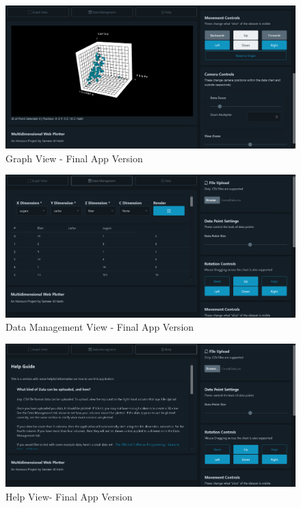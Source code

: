 \begin{figure}[h]
    \centering
    \includegraphics[width=1\textwidth]{author-files/figures/Graph-Fin.PNG}
    \caption{Graph View - Final App Version}
    \label{fig:graphfin}
\end{figure}
\begin{figure}[h]
    \centering
    \includegraphics[width=1\columnwidth]{author-files/figures/data-fin.PNG}
    \caption{Data Management View - Final App Version}
    \label{fig:datafin}
\end{figure}
\begin{figure}[h]
    \centering
    \includegraphics[width=1\columnwidth]{author-files/figures/help-fin.PNG}
    \caption{Help View- Final App Version}
    \label{fig:helpfin}
\end{figure}

